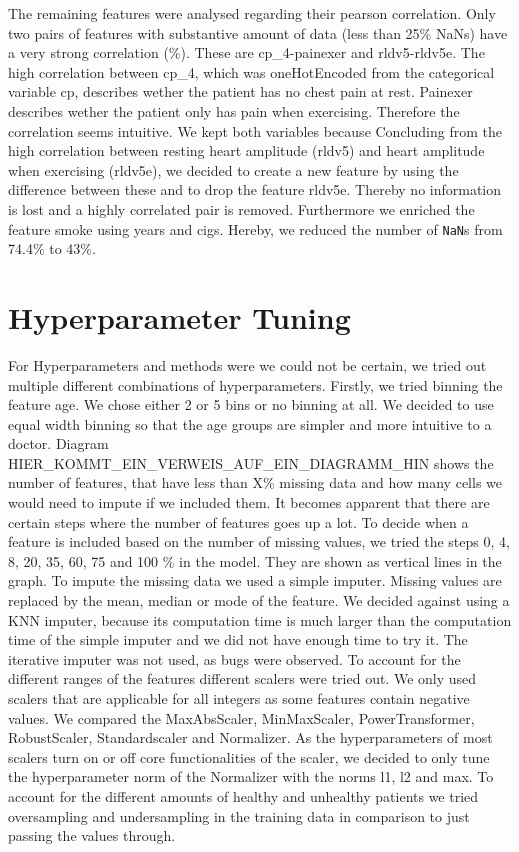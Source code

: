 The remaining features were analysed regarding their pearson correlation. Only two pairs of features with substantive amount of data (less than 25\% NaNs) have a very strong correlation (\%).  These are cp_4\<-\>painexer and rldv5\<-\>rldv5e. The high correlation between cp_4, which was oneHotEncoded from the categorical variable cp, describes wether the patient has no chest pain at rest. Painexer describes wether the patient only has pain when exercising. Therefore the correlation seems intuitive. We kept both variables because 
Concluding from the high correlation between resting heart amplitude (rldv5) and heart amplitude when exercising (rldv5e), we decided to create a new feature by using the difference between these and to drop the feature rldv5e. Thereby no information is lost and a highly correlated pair is removed. Furthermore we enriched the feature smoke using years and cigs. Hereby, we reduced the number of \texttt{NaN}s from 74.4\% to 43\%. 

\section{Hyperparameter Tuning }
For Hyperparameters and methods were we could not be certain, we tried out multiple different combinations of hyperparameters.
Firstly, we tried binning the feature age. We chose either 2 or 5 bins or no binning at all. We decided to use equal width binning so that the age groups are simpler and more intuitive to a doctor.
Diagram HIER\_KOMMT\_EIN\_VERWEIS\_AUF\_EIN\_DIAGRAMM\_HIN shows the number of features, that have less than X\% missing data and how many cells we would need to impute if we included them. It becomes apparent that there are certain steps where the number of features goes up a lot. To decide when a feature is included based on the number of missing values, we tried the steps 0, 4, 8, 20, 35, 60, 75 and 100 \% in the model. They are shown as vertical lines in the graph.
To impute the missing data we used a simple imputer. Missing values are replaced by the mean, median or mode of the feature. We decided against using a KNN imputer, because its computation time is much larger than the computation time of the simple imputer and we did not have enough time to try it. The iterative imputer was not used, as bugs were observed.
To account for the different ranges of the features different scalers were tried out. We only used scalers that are applicable for all integers as some features contain negative values. 
We compared the MaxAbsScaler, MinMaxScaler, PowerTransformer, RobustScaler, Standardscaler and Normalizer. As the hyperparameters of most scalers turn on or off core functionalities of the scaler, we decided to only tune the hyperparameter norm of the Normalizer with the norms l1, l2 and max.
To account for the different amounts of healthy and unhealthy patients we tried oversampling and undersampling in the training data in comparison to just passing the values through.





